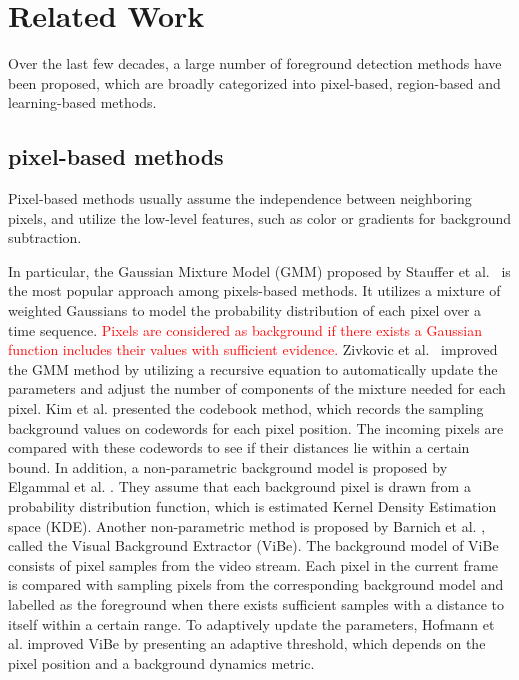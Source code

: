 \documentclass[journal]{IEEEtran}
\begin{document}
\section{Related Work}
\label{sec2}
Over the last few decades, a large number of foreground detection methods have been proposed,
which are broadly categorized into pixel-based, region-based and learning-based methods.
\subsection{pixel-based methods}
Pixel-based methods usually assume the independence between neighboring pixels,
and utilize the low-level features, such as color or gradients for background subtraction.

In particular, the Gaussian Mixture Model (GMM) proposed by Stauffer et al.\ \cite{Stauffer1999} is the most popular approach among pixels-based methods\cite{Goyal2018}.
It utilizes a mixture of weighted Gaussians to model the probability distribution of each pixel over a time sequence.
%
\textcolor{red}{Pixels are considered as background if there exists a Gaussian function includes their values with sufficient evidence.} 
Zivkovic et al.\ \cite{Zivkovic2004} improved the GMM method by utilizing a recursive equation
to automatically update the parameters and adjust the number of components of the mixture needed for each pixel. 
%
Kim et al.\cite{Kim2005} presented the codebook method, which records the sampling background values on codewords for each pixel position.
The incoming pixels are compared with these codewords to see if their distances lie within a certain bound. 
In addition, a non-parametric background model is proposed by Elgammal et al. \cite{Elgammal2000Non}. 
They assume that each background pixel is drawn from a probability distribution function, which is estimated Kernel Density Estimation space (KDE). 
Another non-parametric method is proposed by Barnich et al. \cite{Barnich2011_2011_TIP}, called the Visual Background Extractor (ViBe). 
%
The background model of ViBe consists of pixel samples from the video stream. 
%
Each pixel in the current frame is compared with sampling pixels from the corresponding background model and labelled as the foreground when there exists sufficient samples with a distance to itself within a certain range. 
To adaptively update the parameters, Hofmann et al.\cite{Hofmann2012Background} improved ViBe by presenting an adaptive threshold, 
which depends on the pixel position and a background dynamics metric.
\end{document}
